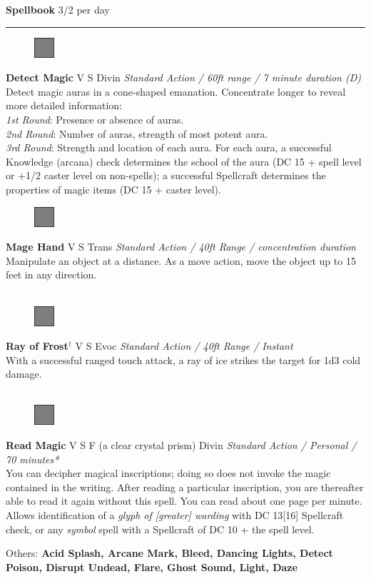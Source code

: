 \documentclass[letterpaper]{article}
\newcommand{\e}[1]{\emph{#1}}
\newcommand{\B}[1]{\textbf{#1}}
\newcommand{\D}[0]{$^\dag$}
\newcommand{\spell}[7]{
\begin{figure}
\vspace{-13pt}
\ifstrequal{#2}{Full}{  \includegraphics[width=2em]{Checkbox-Full}}{
\ifstrequal{#2}{Scroll}{\includegraphics[width=2em]{Checkbox-S}}{
                        \includegraphics[width=2em]{Checkbox}}}
\ifstrequal{#7}{}{\vspace{-1em}}{\vspace{#7}}
\end{figure}
 \B{#1} #3 {
    \ifstrequal{#4}{Conj}{\color{Plum}Conj}{%
    \ifstrequal{#4}{Divin}{\color{YellowOrange}Divin}{%
    \ifstrequal{#4}{Ench}{\color{VioletRed}Ench}{%
    \ifstrequal{#4}{Trans}{\color{LimeGreen}Trans}{%
    \ifstrequal{#4}{Evoc}{\color{RedOrange}Evoc}{%
    \ifstrequal{#4}{Illu}{\color{ProcessBlue}Illu}{%
    \ifstrequal{#4}{Abjur}{\color{CadetBlue}Abjur}{%
    \ifstrequal{#4}{Necro}{\color{Red}Necro}{%
}}}}}}}}}
{\footnotesize \e{#5}} \\
#6
}
\begin{document}
{\huge \B{Spellbook}} \hspace{2em}3/2 per day\par
\hrule\vspace{0.5em}


\spell{Detect Magic}{Full}{V S}{Divin}{Standard Action / 60ft range / 7 minute duration (D)}{
Detect magic auras in a cone-shaped emanation.  Concentrate longer to reveal more detailed information:\\
\e{1st Round}: Presence or absence of auras.\\
\e{2nd Round}: Number of auras, strength of most potent aura.\\
\e{3rd Round}: Strength and location of each aura.  For each aura, a successful Knowledge (arcana) check determines the school of the aura (DC 15 + spell level or +1/2 caster level on non-spells); a successful Spellcraft determines the properties of magic items (DC 15 + caster level).}{3em} %

\spell{Mage Hand}{Full}{V S}{Trans}{Standard Action / 40ft Range / concentration duration}{%
Manipulate an object at a distance. As a move action, move the object up to 15 feet in any direction.\\}{}\\[-2em] %

\spell{Ray of Frost\D}{Full}{V S}{Evoc}{Standard Action / 40ft Range / Instant}{
With a successful ranged touch attack, a ray of ice strikes the target for 1d3 cold damage.\\}{}\\[-2em] %

\spell{Read Magic}{Full}{V S F (a clear crystal prism)}{Divin}{Standard Action / Personal / 70 minutes*}{
You can decipher magical inscriptions; doing so does not invoke the magic contained in the writing.  After reading a particular inscription, you are thereafter able to read it again without this spell.  You can read about one page per minute. Allows identification of a \e{glyph of [greater] warding} with DC 13[16] Spellcraft check, or any \e{symbol} spell with a Spellcraft of DC 10 + the spell level.}{1em}\\[-1em] %
\begin{adjustwidth}{3em}{0em}
Others: \B{Acid Splash, Arcane Mark, Bleed, Dancing Lights, Detect Poison, Disrupt Undead, Flare, Ghost Sound, Light, Daze}\\
\end{adjustwidth}
\end{document}

